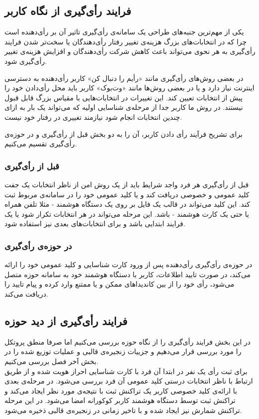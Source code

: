 \subsection{فرایند رأی‌گیری از نگاه کاربر}
یکی از مهم‌ترین جنبه‌های طراحی یک سامانه‌ی رأی‌گیری تاثیر آن بر رأی‌دهنده است چرا که در انتخابات‌های بزرگ هزینه‌ی تغییر رفتار رأی‌دهندگان یا سخت‌تر شدن فرایند رأی‌گیری به هر نحوی می‌تواند باعث کاهش شرکت رأی‌دهندگان و افزایش هزینه‌ی تغییر رأی‌گیری شود.
\par
در بعضی روش‌های رأی‌گیری مانند «رأیم را دنبال کن»
 کاربر رأی‌دهنده به دسترسی اینترنت نیاز دارد و یا در بعضی روش‌‌ها مانند «وت‌بوک»
 \cite{votebook}
  کاربر باید محل رأی‌دادن خود را پیش از انتخابات تعیین کند. این تغییرات در انتخابات‌هایی با مقیاس بزرگ قابل قبول نیستند. در روش ما کاربر جدا از مرحله‌ی شناسایی اولیه که می‌تواند یک بار به ازای چندین انتخابات انجام شود نیازمند تغییری در رفتار خود نیست. 
\par
برای تشریح فرآیند رأی‌ دادن کاربر، آن را به دو بخش قبل از رأی‌گیری و در حوزه‌ی رأی‌گیری تقسیم می‌کنیم. 
\subsubsection{قبل از رأی‌گیری}
قبل از رأی‌گیری هر فرد واجد شرایط باید از یک روش امن از ناظر انتخابات یک جفت کلید عمومی و خصوصی دریافت کند و یا کلید عمومی خود را در سامانه‌ی مربوط ثبت کند. این کلید می‌تواند در قالب یک فایل بر روی یک دستگاه هوشمند - مثلا تلفن همراه یا حتی یک کارت هوشمند - باشد. این مرحله  می‌تواند در هر انتخابات تکرار شود یا یک فرایند ابتدایی باشد و برای انتخابات‌های بعدی نیز استفاده شود. 
\subsubsection{در حوزه‌ی رأی‌گیری}
در حوزه‌ی رأی‌گیری رأی‌دهنده پس از ورود کارت شناسایی و کلید عمومی خود را ارائه می‌کند، در صورت تایید اطلاعات، کاربر با دستگاه هوشمند خود به سامانه‌ حوزه متصل می‌شود، رأی‌ خود را از بین‌ کاندیدا‌های ممکن و یا ممتنع وارد کرده و پیام تایید را دریافت می‌کند. 
\subsection{فرایند رأی‌گیری از دید حوزه‌}
در این بخش فرایند رأی‌گیری را از نگاه حوزه‌ بررسی می‌کنیم اما صرفا منطق پروتکل را مورد بررسی قرار می‌دهیم و جزییات زنجیره‌ی قالبی و عملیات توزیع شده را در بخش آخر فصل بررسی می‌کنیم. 
\\
برای ثبت رأی یک‌ نفر در ابتدا آن فرد با کارت شناسایی احراز هویت شده و از طریق ارتباط با ناظر انتخابات درستی کلید عمومی آن فرد بررسی می‌شود. در مرحله‌ی بعدی با ارائه‌ی کلید خصوصی کاربر یک تراکنش ثبت با نتیجه‌ی مورد نظر ایجاد می‌کند و تراکنش ثبت توسط دستگاه هوشمند کاربر کوکورانه امضا می‌شود. در این مرحله تراکنش شمارش نیز ایجاد شده و با تاخیر زمانی در زنجیره‌ی قالبی ذخیره می‌شود.

